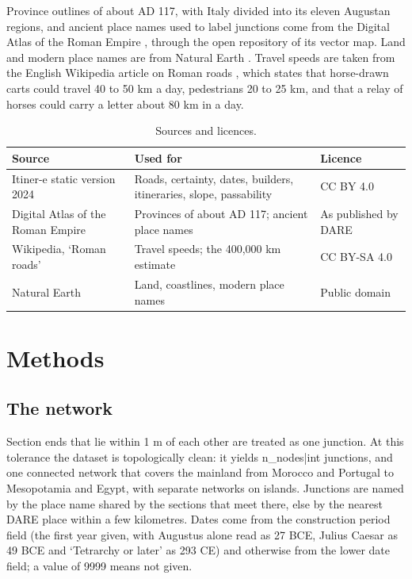 \documentclass[11pt,a4paper]{article}
\begin{document}
Province outlines of about AD 117, with Italy divided into its eleven Augustan regions, and ancient place names used to label junctions come from the Digital Atlas of the Roman Empire \citep{dare}, through the open repository of its vector map. Land and modern place names are from Natural Earth \citep{naturalearth}. Travel speeds are taken from the English Wikipedia article on Roman roads \citep{wikiroads}, which states that horse-drawn carts could travel 40 to 50 km a day, pedestrians 20 to 25 km, and that a relay of horses could carry a letter about 80 km in a day.

\begin{table}[tbp]\centering\small\caption{Sources and licences.}\label{tab:sources}
\begin{tabular}{>{\raggedright\arraybackslash}p{4.4cm}>{\raggedright\arraybackslash}p{7cm}>{\raggedright\arraybackslash}p{3cm}}\toprule Source & Used for & Licence\\\midrule
Itiner-e static version 2024 & Roads, certainty, dates, builders, itineraries, slope, passability & CC BY 4.0\\
Digital Atlas of the Roman Empire & Provinces of about AD 117; ancient place names & As published by DARE\\
Wikipedia, `Roman roads' & Travel speeds; the 400,000 km estimate & CC BY-SA 4.0\\
Natural Earth & Land, coastlines, modern place names & Public domain\\
\bottomrule\end{tabular}\end{table}

\section{Methods}
\subsection{The network}
Section ends that lie within 1 m of each other are treated as one junction. At this tolerance the dataset is topologically clean: it yields {{n_nodes|int}} junctions, and one connected network that covers the mainland from Morocco and Portugal to Mesopotamia and Egypt, with separate networks on islands. Junctions are named by the place name shared by the sections that meet there, else by the nearest DARE place within a few kilometres. Dates come from the construction period field (the first year given, with Augustus alone read as 27 BCE, Julius Caesar as 49 BCE and `Tetrarchy or later' as 293 CE) and otherwise from the lower date field; a value of 9999 means not given.
\end{document}
